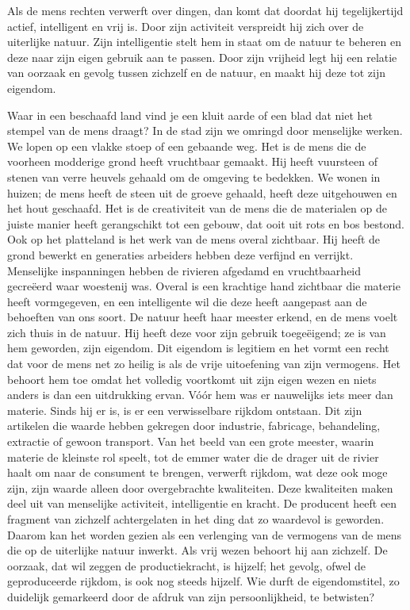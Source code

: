 \documentclass[
  a5paper,
  smalldemyvopaper,10pt,twoside,onecolumn,openright,extrafontsizes,hidelinks]{memoir}
\renewenvironment{quote}%
               {\list{}{\rightmargin=.6cm\leftmargin=.6cm}%
                \itshape \item[]}%
               {\endlist}
\begin{document}
\begin{quote}
Als de mens rechten verwerft over dingen, dan komt dat doordat hij
tegelijkertijd actief, intelligent en vrij is. Door zijn activiteit
verspreidt hij zich over de uiterlijke natuur. Zijn intelligentie stelt
hem in staat om de natuur te beheren en deze naar zijn eigen gebruik aan
te passen. Door zijn vrijheid legt hij een relatie van oorzaak en gevolg
tussen zichzelf en de natuur, en maakt hij deze tot zijn eigendom.

Waar in een beschaafd land vind je een kluit aarde of een blad dat niet
het stempel van de mens draagt? In de stad zijn we omringd door
menselijke werken. We lopen op een vlakke stoep of een gebaande weg. Het
is de mens die de voorheen modderige grond heeft vruchtbaar gemaakt. Hij
heeft vuursteen of stenen van verre heuvels gehaald om de omgeving te
bedekken. We wonen in huizen; de mens heeft de steen uit de groeve
gehaald, heeft deze uitgehouwen en het hout geschaafd. Het is de
creativiteit van de mens die de materialen op de juiste manier heeft
gerangschikt tot een gebouw, dat ooit uit rots en bos bestond. Ook op
het platteland is het werk van de mens overal zichtbaar. Hij heeft de
grond bewerkt en generaties arbeiders hebben deze verfijnd en verrijkt.
Menselijke inspanningen hebben de rivieren afgedamd en vruchtbaarheid
gecreëerd waar woestenij was. Overal is een krachtige hand zichtbaar die
materie heeft vormgegeven, en een intelligente wil die deze heeft
aangepast aan de behoeften van ons soort. De natuur heeft haar meester
erkend, en de mens voelt zich thuis in de natuur. Hij heeft deze voor
zijn gebruik toegeëigend; ze is van hem geworden, zijn eigendom. Dit
eigendom is legitiem en het vormt een recht dat voor de mens net zo
heilig is als de vrije uitoefening van zijn vermogens. Het behoort hem
toe omdat het volledig voortkomt uit zijn eigen wezen en niets anders is
dan een uitdrukking ervan. Vóór hem was er nauwelijks iets meer dan
materie. Sinds hij er is, is er een verwisselbare rijkdom ontstaan. Dit
zijn artikelen die waarde hebben gekregen door industrie, fabricage,
behandeling, extractie of gewoon transport. Van het beeld van een grote
meester, waarin materie de kleinste rol speelt, tot de emmer water die
de drager uit de rivier haalt om naar de consument te brengen, verwerft
rijkdom, wat deze ook moge zijn, zijn waarde alleen door overgebrachte
kwaliteiten. Deze kwaliteiten maken deel uit van menselijke activiteit,
intelligentie en kracht. De producent heeft een fragment van zichzelf
achtergelaten in het ding dat zo waardevol is geworden. Daarom kan het
worden gezien als een verlenging van de vermogens van de mens die op de
uiterlijke natuur inwerkt. Als vrij wezen behoort hij aan zichzelf. De
oorzaak, dat wil zeggen de productiekracht, is hijzelf; het gevolg,
ofwel de geproduceerde rijkdom, is ook nog steeds hijzelf. Wie durft de
eigendomstitel, zo duidelijk gemarkeerd door de afdruk van zijn
persoonlijkheid, te betwisten?


\end{quote}
\end{document}
